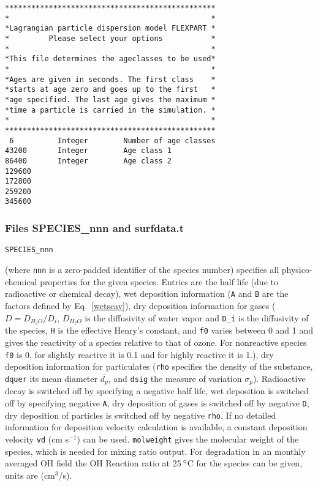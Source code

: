 \documentclass{egu}                  %
\newcommand{\degreee}{{$\, \rm ^{\circ}$}}
\begin{document}
\begin{footnotesize}\begin{verbatim}
************************************************
*                                              *
*Lagrangian particle dispersion model FLEXPART *
*         Please select your options           *
*                                              *
*This file determines the ageclasses to be used*
*                                              *
*Ages are given in seconds. The first class    *
*starts at age zero and goes up to the first   *
*age specified. The last age gives the maximum *
*time a particle is carried in the simulation. *
*                                              *
************************************************
 6          Integer        Number of age classes
43200       Integer        Age class 1
86400       Integer        Age class 2
129600
172800
259200
345600
\end{verbatim}\end{footnotesize}

\newpage

\subsubsection{Files SPECIES\_nnn and surfdata.t}

\begin{footnotesize}\verb|SPECIES_nnn|\end{footnotesize} (where \verb|nnn| is 
a zero-padded identifier of the species number) specifies all physico-chemical
properties for the given species.  Entries are the half life (due to
radioactive or chemical decay), wet deposition information (\verb|A| and \verb|B| are the
factors defined by Eq.~\ref{wetscav}), dry deposition information for
gases ($D=D_{H_2O}/D_i$, $D_{H_2O}$ is the diffusivity of water vapor and \verb|D_i|
is the diffusivity of the species, \verb|H| is the effective Henry's constant, and
\verb|f0| varies between 0 and 1 and gives the reactivity of a species relative to
that of ozone.  For nonreactive species \verb|f0| is 0, for slightly reactive it is
0.1 and for highly reactive it is 1.), dry deposition information for
particulates (\verb|rho| specifies the density of the substance, \verb|dquer| its mean
diameter $\overline{d_p}$, and \verb|dsig| the measure of variation $\sigma_p$).
Radioactive decay is switched off by specifying a negative half life, wet
deposition is switched off by specifying negative \verb|A|, dry deposition of gases
is switched off by negative \verb|D|, dry deposition of particles is switched off by
negative \verb|rho|.  If no detailed information for deposition velocity calculation
is available, a constant deposition velocity \verb|vd| (cm s$^{-1}$) can be used.
\verb|molweight| gives the molecular weight of the species, which is needed for
mixing ratio output.  For degradation in an monthly averaged OH field
\citep{bey2001} the OH Reaction ratio at 25\degreee C for the species can be given,
units are (cm$^3$/s).
\end{document}
